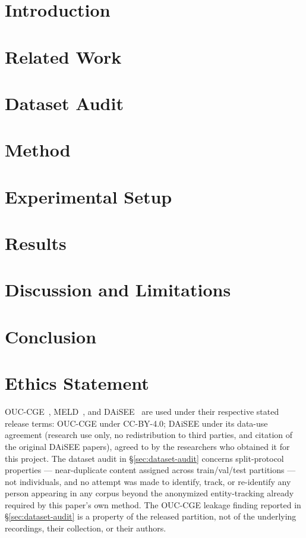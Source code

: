 \documentclass[sigconf]{acmart}
\begin{document}
\section{Introduction}


\section{Related Work}


\section{Dataset Audit}


\section{Method}


\section{Experimental Setup}


\section{Results}


\section{Discussion and Limitations}


\section{Conclusion}


\section*{Ethics Statement}
OUC-CGE~\cite{lu2025ouccge}, MELD~\cite{poria2019meld}, and
DAiSEE~\cite{gupta2016daisee} are used under their respective stated
release terms: OUC-CGE under CC-BY-4.0; DAiSEE under its data-use agreement
(research use only, no redistribution to third parties, and citation of the
original DAiSEE papers), agreed to by the researchers who obtained it for
this project. The dataset audit in \S\ref{sec:dataset-audit} concerns
split-protocol properties --- near-duplicate content assigned across
train/val/test partitions --- not individuals, and no attempt was made to
identify, track, or re-identify any person appearing in any corpus beyond
the anonymized entity-tracking already required by this paper's own method.
The OUC-CGE leakage finding reported in \S\ref{sec:dataset-audit} is a
property of the released partition, not of the underlying recordings,
their collection, or their authors.



\end{document}
